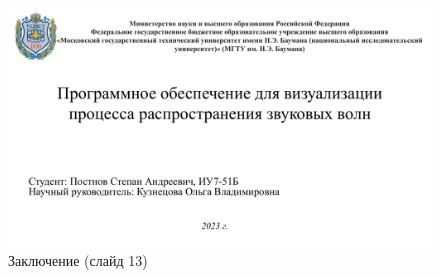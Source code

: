 \begin{figure}[h]
\centering
\includegraphics[height=0.5\textheight, page=13, angle=90]{inc/img/pres.pdf}
\caption{Заключение (слайд 13)}
\end{figure}